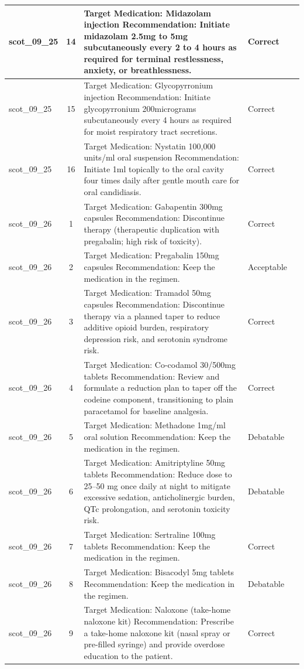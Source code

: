 \begin{longtable}{|p{1.45cm}|c|p{10.2cm}|p{1.55cm}|p{2.3cm}|}
\hline
scot\_09\_25 & 14 & Target Medication: Midazolam injection Recommendation: Initiate midazolam 2.5mg to 5mg subcutaneously every 2 to 4 hours as required for terminal restlessness, anxiety, or breathlessness. & Correct &  \\
\hline
scot\_09\_25 & 15 & Target Medication: Glycopyrronium injection Recommendation: Initiate glycopyrronium 200micrograms subcutaneously every 4 hours as required for moist respiratory tract secretions. & Correct &  \\
\hline
scot\_09\_25 & 16 & Target Medication: Nystatin 100,000 units/ml oral suspension Recommendation: Initiate 1ml topically to the oral cavity four times daily after gentle mouth care for oral candidiasis. & Correct &  \\
\hline
scot\_09\_26 & 1 & Target Medication: Gabapentin 300mg capsules Recommendation: Discontinue therapy (therapeutic duplication with pregabalin; high risk of toxicity). & Correct &  \\
\hline
scot\_09\_26 & 2 & Target Medication: Pregabalin 150mg capsules Recommendation: Keep the medication in the regimen. & Acceptable &  \\
\hline
scot\_09\_26 & 3 & Target Medication: Tramadol 50mg capsules Recommendation: Discontinue therapy via a planned taper to reduce additive opioid burden, respiratory depression risk, and serotonin syndrome risk. & Correct &  \\
\hline
scot\_09\_26 & 4 & Target Medication: Co-codamol 30/500mg tablets Recommendation: Review and formulate a reduction plan to taper off the codeine component, transitioning to plain paracetamol for baseline analgesia. & Correct &  \\
\hline
scot\_09\_26 & 5 & Target Medication: Methadone 1mg/ml oral solution Recommendation: Keep the medication in the regimen. & Debatable &  \\
\hline
scot\_09\_26 & 6 & Target Medication: Amitriptyline 50mg tablets Recommendation: Reduce dose to 25–50 mg once daily at night to mitigate excessive sedation, anticholinergic burden, QTc prolongation, and serotonin toxicity risk. & Debatable &  \\
\hline
scot\_09\_26 & 7 & Target Medication: Sertraline 100mg tablets Recommendation: Keep the medication in the regimen. & Correct &  \\
\hline
scot\_09\_26 & 8 & Target Medication: Bisacodyl 5mg tablets Recommendation: Keep the medication in the regimen. & Debatable &  \\
\hline
scot\_09\_26 & 9 & Target Medication: Naloxone (take-home naloxone kit) Recommendation: Prescribe a take-home naloxone kit (nasal spray or pre-filled syringe) and provide overdose education to the patient. & Correct &  \\
\hline
\end{longtable}
